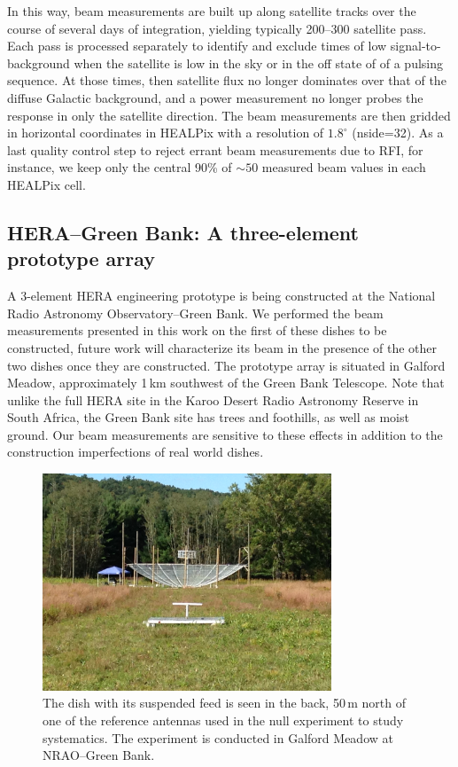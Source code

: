 \documentclass{emulateapj}
\begin{document}
In this way, beam measurements are built up along satellite tracks over the course of 
several days of integration, yielding typically 200--300 satellite pass. Each pass is 
processed separately to identify and exclude times of low signal-to-background when the 
satellite is low in the sky or in the off state of of a pulsing sequence. At those times, then 
satellite flux no longer dominates over that of the diffuse Galactic background, and a 
power measurement no longer probes the response in only the satellite direction. The beam 
measurements are then gridded in horizontal coordinates in HEALPix \citep{healpix} with a resolution of 
$1.8^\circ$ (nside=32). As a last quality control step to reject errant beam measurements 
due to RFI, for instance, we keep only the central 90\% of $\sim50$ measured beam 
values in each HEALPix cell.


\subsection{HERA--Green Bank: A three-element prototype array}

A 3-element HERA engineering prototype is being constructed at the National Radio 
Astronomy Observatory--Green Bank. We performed the beam measurements presented in 
this work on the first of these dishes to be constructed, future work will characterize its beam in the presence of the other two dishes once they are constructed. The prototype array is situated in Galford Meadow, approximately 1\,km southwest of the Green Bank Telescope. Note that unlike the full HERA site in the Karoo Desert Radio Astronomy Reserve in 
South Africa, the Green Bank site has trees and foothills, as well as moist ground. Our beam measurements
are sensitive to these effects in addition to the construction imperfections of real world dishes.

\begin{figure}[h]
\includegraphics[width=3.4in]{IMG_0353.JPG}
\caption{The dish with its suspended feed is seen in the back, 50\,m north of one of the reference antennas used in the null experiment to study systematics. The experiment is conducted in Galford Meadow at NRAO--Green Bank.}
\label{fig:greenbankdishphoto}
\end{figure}
\end{document}
